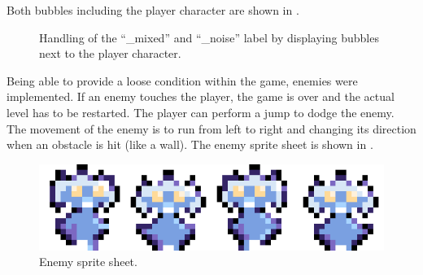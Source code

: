 Both bubbles including the player character are shown in .
\begin{figure}[!ht]
  \centering
  \hspace{2 cm}
  \caption{Handling of the \enquote{\_mixed} and \enquote{\_noise} label by displaying bubbles next to the player character.}
  \label{fig:game_design_mechanic_bubble}
\end{figure}
\FloatBarrier
\noindent
Being able to provide a loose condition within the game, enemies were implemented.
If an enemy touches the player, the game is over and the actual level has to be restarted.
The player can perform a jump to dodge the enemy.
The movement of the enemy is to run from left to right and changing its direction when an obstacle is hit (like a wall).
The enemy sprite sheet is shown in .
\begin{figure}[!ht]
  \centering
  \includegraphics[height=0.07\textwidth]{./6_game/figs/game_design_mechanic_enemy}
  \caption{Enemy sprite sheet.}
  \label{fig:game_design_mechanic_enemy}
\end{figure}
\FloatBarrier
\noindent



